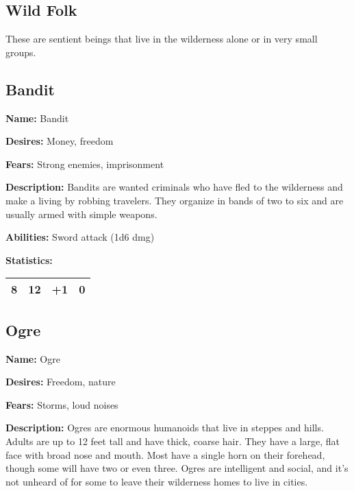 \begin{multicols}{2}
\section{Wild Folk}

These are sentient beings that live in the wilderness alone or
in very small groups.

\subsection{Bandit}

\textbf{Name:} Bandit

\textbf{Desires:} Money, freedom

\textbf{Fears:} Strong enemies, imprisonment

\textbf{Description:} Bandits are wanted criminals who have fled to the wilderness and make
a living by robbing travelers. They organize in bands of two to six and are usually armed with
simple weapons.

\textbf{Abilities:} Sword attack (1d6 dmg)

\textbf{Statistics:}

\begin{center}
{
\begin{xtabular}{|l|l|l|l|}
8 & 12 & +1 & 0 \\
\hline
\end{xtabular}
}
\end{center}

\subsection{Ogre}

\textbf{Name:} Ogre

\textbf{Desires:} Freedom, nature

\textbf{Fears:} Storms, loud noises

\textbf{Description:} Ogres are enormous humanoids that live in steppes and hills. Adults
are up to 12 feet tall and have thick, coarse hair. They have a large, flat face with broad
nose and mouth. Most have a single horn on their forehead, though some will have two or even
three. Ogres are intelligent and social, and it's not unheard of for some to leave their
wilderness homes to live in cities.


\end{multicols}
